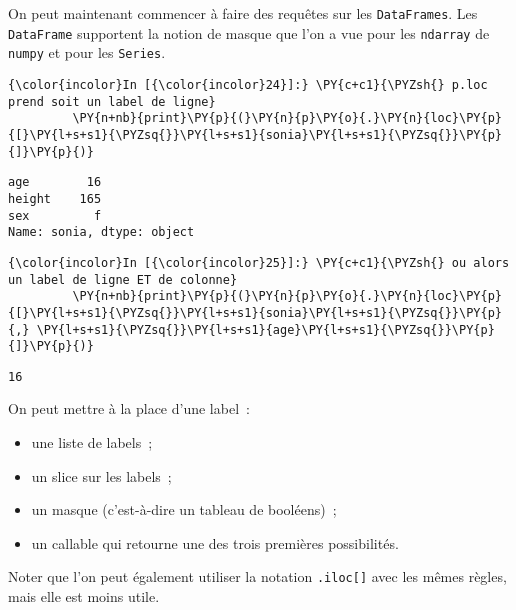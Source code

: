     On peut maintenant commencer à faire des requêtes sur les
\texttt{DataFrames}. Les \texttt{DataFrame} supportent la notion de
masque que l'on a vue pour les \texttt{ndarray} de \texttt{numpy} et
pour les \texttt{Series}.

    \begin{Verbatim}[commandchars=\\\{\}]
{\color{incolor}In [{\color{incolor}24}]:} \PY{c+c1}{\PYZsh{} p.loc prend soit un label de ligne}
         \PY{n+nb}{print}\PY{p}{(}\PY{n}{p}\PY{o}{.}\PY{n}{loc}\PY{p}{[}\PY{l+s+s1}{\PYZsq{}}\PY{l+s+s1}{sonia}\PY{l+s+s1}{\PYZsq{}}\PY{p}{]}\PY{p}{)}
\end{Verbatim}


    \begin{Verbatim}[commandchars=\\\{\}]
age        16
height    165
sex         f
Name: sonia, dtype: object

    \end{Verbatim}

    \begin{Verbatim}[commandchars=\\\{\}]
{\color{incolor}In [{\color{incolor}25}]:} \PY{c+c1}{\PYZsh{} ou alors un label de ligne ET de colonne}
         \PY{n+nb}{print}\PY{p}{(}\PY{n}{p}\PY{o}{.}\PY{n}{loc}\PY{p}{[}\PY{l+s+s1}{\PYZsq{}}\PY{l+s+s1}{sonia}\PY{l+s+s1}{\PYZsq{}}\PY{p}{,} \PY{l+s+s1}{\PYZsq{}}\PY{l+s+s1}{age}\PY{l+s+s1}{\PYZsq{}}\PY{p}{]}\PY{p}{)}
\end{Verbatim}


    \begin{Verbatim}[commandchars=\\\{\}]
16

    \end{Verbatim}

    On peut mettre à la place d'une label~:

\begin{itemize}
\tightlist
\item
  une liste de labels~;
\item
  un slice sur les labels~;
\item
  un masque (c'est-à-dire un tableau de booléens)~;
\item
  un callable qui retourne une des trois premières possibilités.
\end{itemize}

Noter que l'on peut également utiliser la notation \texttt{.iloc{[}{]}}
avec les mêmes règles, mais elle est moins utile.

